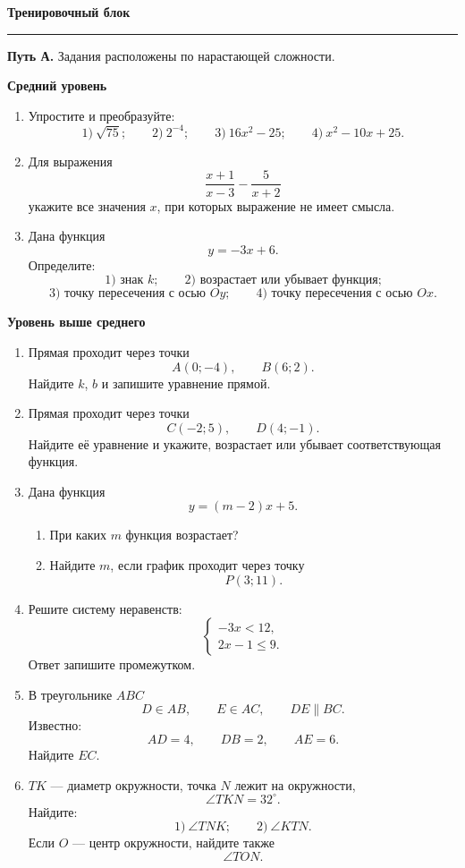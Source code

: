 \documentclass[a4paper,12pt]{article}
\newcommand{\topic}[1]{%
  \vspace{0.4em}
  {\Large\bfseries\color{darkaccent}#1\par}
  \vspace{0.25em}
  {\color{accent}\rule{\linewidth}{0.7pt}}
  \vspace{0.45em}
}
\newcommand{\subtopic}[1]{%
  \vspace{0.5em}
  {\large\bfseries\color{darkaccent}#1\par}
  \vspace{0.2em}
}
\begin{document}
\newpage
\topic{Тренировочный блок}

\textbf{Путь А.} Задания расположены по нарастающей сложности.

\subtopic{Средний уровень}

\begin{enumerate}

\item Упростите и преобразуйте:
\[
\text{1)}\ \sqrt{75};
\qquad
\text{2)}\ 2^{-4};
\qquad
\text{3)}\ 16x^2-25;
\qquad
\text{4)}\ x^2-10x+25.
\]

\item Для выражения
\[
\frac{x+1}{x-3}-\frac5{x+2}
\]
укажите все значения \(x\), при которых выражение не имеет смысла.

\item Дана функция
\[
y=-3x+6.
\]
Определите:
\[
\text{1) знак }k;
\qquad
\text{2) возрастает или убывает функция;}
\]
\[
\text{3) точку пересечения с осью }Oy;
\qquad
\text{4) точку пересечения с осью }Ox.
\]

\end{enumerate}

\subtopic{Уровень выше среднего}

\begin{enumerate}[resume]

\item Прямая проходит через точки
\[
A(0;-4),
\qquad
B(6;2).
\]
Найдите \(k\), \(b\) и запишите уравнение прямой.

\item Прямая проходит через точки
\[
C(-2;5),
\qquad
D(4;-1).
\]
Найдите её уравнение и укажите, возрастает или убывает соответствующая функция.

\item Дана функция
\[
y=(m-2)x+5.
\]

\begin{enumerate}[label=\arabic*)]
\item При каких \(m\) функция возрастает?
\item Найдите \(m\), если график проходит через точку
\[
P(3;11).
\]
\end{enumerate}

\item Решите систему неравенств:
\[
\begin{cases}
-3x<12,\\
2x-1\le9.
\end{cases}
\]
Ответ запишите промежутком.

\item В треугольнике \(ABC\)
\[
D\in AB,\qquad E\in AC,\qquad DE\parallel BC.
\]
Известно:
\[
AD=4,\qquad DB=2,\qquad AE=6.
\]
Найдите \(EC\).

\item \(TK\) --- диаметр окружности, точка \(N\) лежит на окружности,
\[
\angle TKN=32^\circ.
\]
Найдите:
\[
\text{1)}\ \angle TNK;
\qquad
\text{2)}\ \angle KTN.
\]
Если \(O\) --- центр окружности, найдите также
\[
\angle TON.
\]

\end{enumerate}
\end{document}

